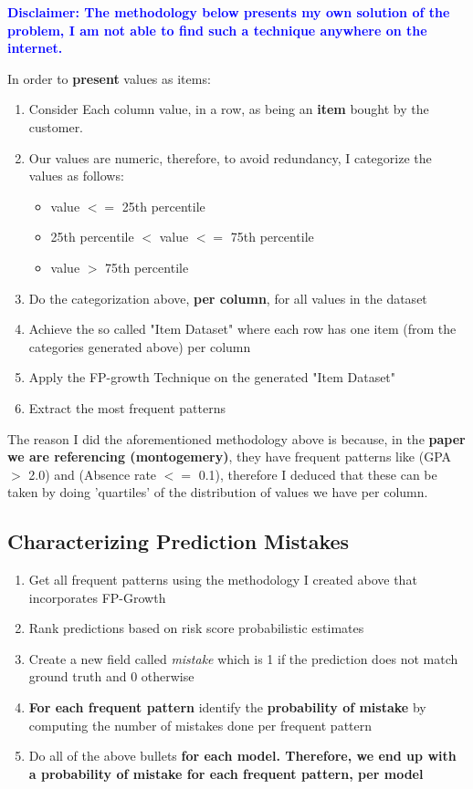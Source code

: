 \documentclass[11pt]{article}
\begin{document}
\textbf{\textcolor{blue}{Disclaimer: The methodology below presents my own solution of the problem, I am not able to find such a technique anywhere on the internet.}}

In order to \textbf{present} values as items:
\begin{enumerate}
\item Consider Each column value, in a row, as being an \textbf{item} bought by the customer.
\item Our values are numeric, therefore, to avoid redundancy, I categorize the values as follows:
\begin{itemize}
\item value $<=$ 25th percentile
\item 25th percentile $<$ value $<=$ 75th percentile
\item value $>$ 75th percentile
\end{itemize}
\item Do the categorization above, \textbf{per column}, for all values in the dataset
\item Achieve the so called "Item Dataset" where each row has one item (from the categories generated above) per column
\item Apply the FP-growth Technique on the generated "Item Dataset"
\item Extract the most frequent patterns
\end{enumerate}

The reason I did the aforementioned methodology above is because, in the \textbf{paper we are referencing (montogemery)}, they have frequent patterns like (GPA $>$ 2.0) and (Absence rate $<=$ 0.1), therefore I deduced that these can be taken by doing 'quartiles' of the distribution of values we have per column.

\subsection{Characterizing Prediction Mistakes}
\begin{enumerate}
\item Get all frequent patterns using the methodology I created above that incorporates FP-Growth
\item Rank predictions based on risk score probabilistic estimates

\item Create a new field called \textit{mistake} which is 1 if the prediction does not match ground truth and 0 otherwise

\item \textbf{For each frequent pattern} identify the \textbf{probability of mistake} by computing the number of mistakes done per frequent pattern

\item Do all of the above bullets \textbf{for each model. Therefore, we end up with a probability of mistake for each frequent pattern, per model}
\end{enumerate}
\end{document}
